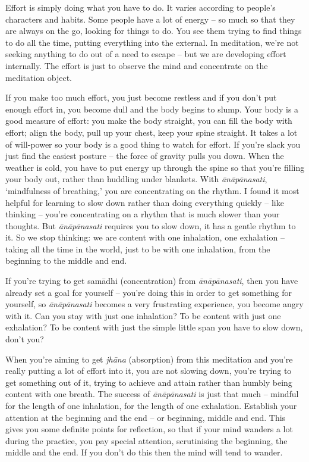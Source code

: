 
Effort is simply doing what you have to do. It varies according to people's characters and habits. Some people have a lot of energy -- so much so that they are always on the go, looking for things to do. You see them trying to find things to do all the time, putting everything into the external. In meditation, we're not seeking anything to do out of a need to escape – but we are developing effort internally. The effort is just to observe the mind and concentrate on the meditation object.

If you make too much effort, you just become restless and if you don't put enough effort in, you become dull and the body begins to slump. Your body is a good measure of effort: you make the body straight, you can fill the body with effort; align the body, pull up your chest, keep your spine straight. It takes a lot of will-power so your body is a good thing to watch for effort. If you're slack you just find the easiest posture -- the force of gravity pulls you down. When the weather is cold, you have to put energy up through the spine so that you're filling your body out, rather than huddling under blankets. With \textit{ānāpānasati}, `mindfulness of breathing,' you are concentrating on the rhythm. I found it most helpful for learning to slow down rather than doing everything quickly -- like thinking -- you're concentrating on a rhythm that is much slower than your thoughts. But \textit{ānāpānasati} requires you to slow down, it has a gentle rhythm to it. So we stop thinking: we are content with one inhalation, one exhalation -- taking all the time in the world, just to be with one inhalation, from the beginning to the middle and end.

If you're trying to get samādhi (concentration) from \textit{ānāpānasati}, then you have already set a goal for yourself -- you're doing this in order to get something for yourself, so \textit{ānāpānasati} becomes a very frustrating experience, you become angry with it. Can you stay with just one inhalation? To be content with just one exhalation? To be content with just the simple little span you have to slow down, don't you?

When you're aiming to get \textit{jhāna} (absorption) from this meditation and you're really putting a lot of effort into it, you are not slowing down, you're trying to get something out of it, trying to achieve and attain rather than humbly being content with one breath. The success of \textit{ānāpānasati} is just that much -- mindful for the length of one inhalation, for the length of one exhalation. Establish your attention at the beginning and the end -- or beginning, middle and end. This gives you some definite points for reflection, so that if your mind wanders a lot during the practice, you pay special attention, scrutinising the beginning, the middle and the end. If you don't do this then the mind will tend to wander.

